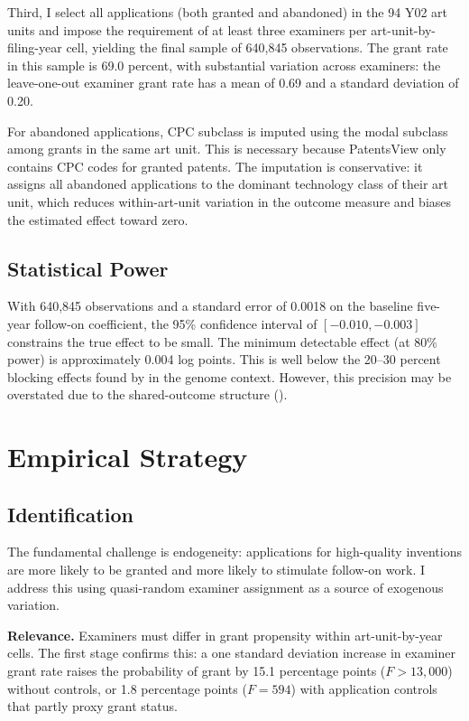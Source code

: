 \documentclass[12pt]{article}
\begin{document}
Third, I select all applications (both granted and abandoned) in the 94 Y02 art units and impose the requirement of at least three examiners per art-unit-by-filing-year cell, yielding the final sample of 640,845 observations. The grant rate in this sample is 69.0 percent, with substantial variation across examiners: the leave-one-out examiner grant rate has a mean of 0.69 and a standard deviation of 0.20.

For abandoned applications, CPC subclass is imputed using the modal subclass among grants in the same art unit. This is necessary because PatentsView only contains CPC codes for granted patents. The imputation is conservative: it assigns all abandoned applications to the dominant technology class of their art unit, which reduces within-art-unit variation in the outcome measure and biases the estimated effect toward zero.

\subsection{Statistical Power}

With 640,845 observations and a standard error of 0.0018 on the baseline five-year follow-on coefficient, the 95\% confidence interval of $[-0.010, -0.003]$ constrains the true effect to be small. The minimum detectable effect (at 80\% power) is approximately 0.004 log points. This is well below the 20--30 percent blocking effects found by \citet{williams2013} in the genome context. However, this precision may be overstated due to the shared-outcome structure ().


\section{Empirical Strategy}

\subsection{Identification}

The fundamental challenge is endogeneity: applications for high-quality inventions are more likely to be granted and more likely to stimulate follow-on work. I address this using quasi-random examiner assignment as a source of exogenous variation.

\textbf{Relevance.} Examiners must differ in grant propensity within art-unit-by-year cells. The first stage confirms this: a one standard deviation increase in examiner grant rate raises the probability of grant by 15.1 percentage points ($F > 13{,}000$) without controls, or 1.8 percentage points ($F = 594$) with application controls that partly proxy grant status.
\end{document}
